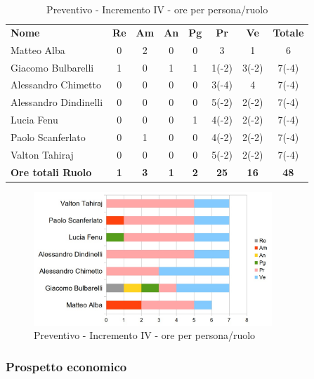 \begin{table} [h!]
	\begin{center}
		\begin{tabular} { m{3.5cm} c c c c c c c }
			\rowcolor{lightgray}
			\textbf{Nome} & \textbf{Re} & \textbf{Am} & \textbf{An} & \textbf{Pg} & \textbf{Pr} & \textbf{Ve} & \textbf{Totale} \\
			Matteo Alba & 0 & 2 & 0 & 0 & 3 & 1 & 6 \\
			Giacomo Bulbarelli & 1 & 0 & 1 & 1 & 1(-2) & 3(-2)& 7(-4) \\
			Alessandro Chimetto & 0 & 0 & 0 & 0 & 3(-4) & 4 & 7(-4) \\
			Alessandro Dindinelli & 0 & 0 & 0 & 0 & 5(-2) & 2(-2) & 7(-4)\\
			Lucia Fenu & 0 & 0 & 0 & 1 & 4(-2) & 2(-2) & 7(-4) \\
			Paolo Scanferlato & 0 & 1 & 0 & 0 & 4(-2) & 2(-2)& 7(-4) \\
			Valton Tahiraj & 0 & 0 & 0 & 0 & 5(-2) & 2(-2)& 7(-4) \\
			\textbf{Ore totali Ruolo} & \textbf{1} & \textbf{3} & \textbf{1} & \textbf{2} & \textbf{25}& \textbf{16} & \textbf{48}
		\end{tabular}
		\caption{Preventivo - Incremento IV - ore per persona/ruolo}
	\end{center}
\end{table}
\begin{figure} [h!]
	\centering
	\includegraphics[width=0.8\textwidth]{res/img/grafici/Incremento4Ore.jpg}
	\caption{Preventivo - Incremento IV - ore per persona/ruolo} 
\end{figure}

\newpage
\subsubsection{Prospetto economico}

